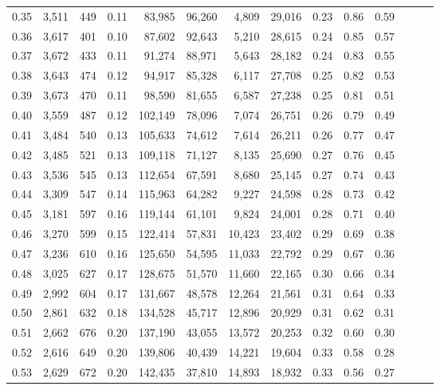 \begin{tabular}{rrrrrrrrrrrrrr}
0.35 &  3,511 &  449 &  0.11 &   83,985 &   96,260 &   4,809 &  29,016 &  0.23 &  0.86 &      0.59 \\
0.36 &  3,617 &  401 &  0.10 &   87,602 &   92,643 &   5,210 &  28,615 &  0.24 &  0.85 &      0.57 \\
0.37 &  3,672 &  433 &  0.11 &   91,274 &   88,971 &   5,643 &  28,182 &  0.24 &  0.83 &      0.55 \\
0.38 &  3,643 &  474 &  0.12 &   94,917 &   85,328 &   6,117 &  27,708 &  0.25 &  0.82 &      0.53 \\
0.39 &  3,673 &  470 &  0.11 &   98,590 &   81,655 &   6,587 &  27,238 &  0.25 &  0.81 &      0.51 \\
0.40 &  3,559 &  487 &  0.12 &  102,149 &   78,096 &   7,074 &  26,751 &  0.26 &  0.79 &      0.49 \\
0.41 &  3,484 &  540 &  0.13 &  105,633 &   74,612 &   7,614 &  26,211 &  0.26 &  0.77 &      0.47 \\
0.42 &  3,485 &  521 &  0.13 &  109,118 &   71,127 &   8,135 &  25,690 &  0.27 &  0.76 &      0.45 \\
0.43 &  3,536 &  545 &  0.13 &  112,654 &   67,591 &   8,680 &  25,145 &  0.27 &  0.74 &      0.43 \\
0.44 &  3,309 &  547 &  0.14 &  115,963 &   64,282 &   9,227 &  24,598 &  0.28 &  0.73 &      0.42 \\
0.45 &  3,181 &  597 &  0.16 &  119,144 &   61,101 &   9,824 &  24,001 &  0.28 &  0.71 &      0.40 \\
0.46 &  3,270 &  599 &  0.15 &  122,414 &   57,831 &  10,423 &  23,402 &  0.29 &  0.69 &      0.38 \\
0.47 &  3,236 &  610 &  0.16 &  125,650 &   54,595 &  11,033 &  22,792 &  0.29 &  0.67 &      0.36 \\
0.48 &  3,025 &  627 &  0.17 &  128,675 &   51,570 &  11,660 &  22,165 &  0.30 &  0.66 &      0.34 \\
0.49 &  2,992 &  604 &  0.17 &  131,667 &   48,578 &  12,264 &  21,561 &  0.31 &  0.64 &      0.33 \\
0.50 &  2,861 &  632 &  0.18 &  134,528 &   45,717 &  12,896 &  20,929 &  0.31 &  0.62 &      0.31 \\
0.51 &  2,662 &  676 &  0.20 &  137,190 &   43,055 &  13,572 &  20,253 &  0.32 &  0.60 &      0.30 \\
0.52 &  2,616 &  649 &  0.20 &  139,806 &   40,439 &  14,221 &  19,604 &  0.33 &  0.58 &      0.28 \\
0.53 &  2,629 &  672 &  0.20 &  142,435 &   37,810 &  14,893 &  18,932 &  0.33 &  0.56 &      0.27 \\

\end{tabular}
